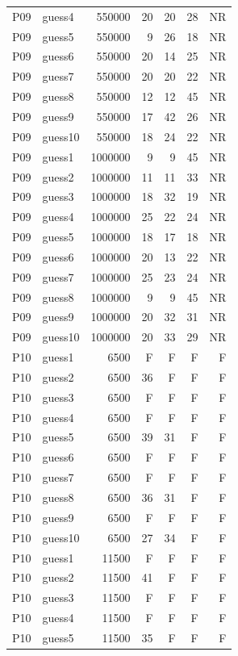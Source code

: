 {\begin{longtable}{llrrrrr}
P09 & guess4 & 550000 & 20 & 20 & 28 & NR \\
P09 & guess5 & 550000 & 9 & 26 & 18 & NR \\
P09 & guess6 & 550000 & 20 & 14 & 25 & NR \\
P09 & guess7 & 550000 & 20 & 20 & 22 & NR \\
P09 & guess8 & 550000 & 12 & 12 & 45 & NR \\
P09 & guess9 & 550000 & 17 & 42 & 26 & NR \\
P09 & guess10 & 550000 & 18 & 24 & 22 & NR \\
P09 & guess1 & 1000000 & 9 & 9 & 45 & NR \\
P09 & guess2 & 1000000 & 11 & 11 & 33 & NR \\
P09 & guess3 & 1000000 & 18 & 32 & 19 & NR \\
P09 & guess4 & 1000000 & 25 & 22 & 24 & NR \\
P09 & guess5 & 1000000 & 18 & 17 & 18 & NR \\
P09 & guess6 & 1000000 & 20 & 13 & 22 & NR \\
P09 & guess7 & 1000000 & 25 & 23 & 24 & NR \\
P09 & guess8 & 1000000 & 9 & 9 & 45 & NR \\
P09 & guess9 & 1000000 & 20 & 32 & 31 & NR \\
P09 & guess10 & 1000000 & 20 & 33 & 29 & NR \\
P10 & guess1 & 6500 & F & F & F & F \\
P10 & guess2 & 6500 & 36 & F & F & F \\
P10 & guess3 & 6500 & F & F & F & F \\
P10 & guess4 & 6500 & F & F & F & F \\
P10 & guess5 & 6500 & 39 & 31 & F & F \\
P10 & guess6 & 6500 & F & F & F & F \\
P10 & guess7 & 6500 & F & F & F & F \\
P10 & guess8 & 6500 & 36 & 31 & F & F \\
P10 & guess9 & 6500 & F & F & F & F \\
P10 & guess10 & 6500 & 27 & 34 & F & F \\
P10 & guess1 & 11500 & F & F & F & F \\
P10 & guess2 & 11500 & 41 & F & F & F \\
P10 & guess3 & 11500 & F & F & F & F \\
P10 & guess4 & 11500 & F & F & F & F \\
P10 & guess5 & 11500 & 35 & F & F & F \\

\end{longtable}}
